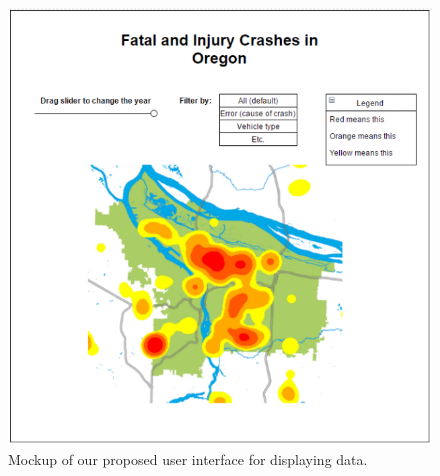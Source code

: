 \documentclass[journal]{vgtc}                %
\begin{document}
\begin{figure}[ui]
  \centering %
  \includegraphics[width=\columnwidth]{interface}
  \caption{Mockup of our proposed user interface for displaying data.}
  \label{fig:sample}
\end{figure}


%

%
%
%


\end{document}
